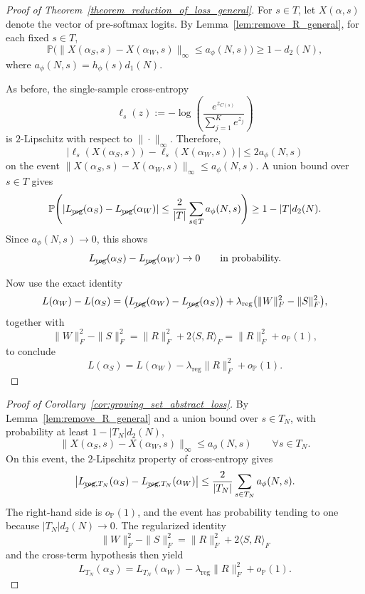 \documentclass[11pt]{article}
\theoremstyle{plain}
\theoremstyle{definition}
\theoremstyle{remark}
\newcommand{\PP}{\mathbb{P}}
\newcommand{\1}{\mathbf{1}}
\begin{document}
\begin{proof}[Proof of Theorem~\ref{theorem_reduction_of_loss_general}]
For \(s\in T\), let \(X(\alpha,s)\) denote the vector of pre-softmax logits. By Lemma~\ref{lem:remove_R_general}, for each fixed \(s\in T\),
\[
\PP\Big(
\|X(\alpha_S,s)-X(\alpha_W,s)\|_\infty\le a_\phi(N,s)
\Big)\ge 1-d_2(N),
\]
where \(a_\phi(N,s)=h_\phi(s)d_1(N)\).

As before, the single-sample cross-entropy
\[
\ell_s(z):=-\log\!\left(\frac{e^{z_{C(s)}}}{\sum_{j=1}^Ke^{z_j}}\right)
\]
is \(2\)-Lipschitz with respect to \(\|\cdot\|_\infty\). Therefore,
\[
|\ell_s(X(\alpha_S,s))-\ell_s(X(\alpha_W,s))|
\le
2a_\phi(N,s)
\]
on the event \(\|X(\alpha_S,s)-X(\alpha_W,s)\|_\infty\le a_\phi(N,s)\). A union bound over \(s\in T\) gives
\[
\PP\!\left(
|L_{\cancel{\mathrm{reg}}}(\alpha_S)-L_{\cancel{\mathrm{reg}}}(\alpha_W)|
\le
\frac{2}{|T|}\sum_{s\in T}a_\phi(N,s)
\right)
\ge
1-|T|d_2(N).
\]
Since \(a_\phi(N,s)\to0\), this shows
\[
L_{\cancel{\mathrm{reg}}}(\alpha_S)-L_{\cancel{\mathrm{reg}}}(\alpha_W)\to0
\qquad\text{in probability.}
\]

Now use the exact identity
\[
L(\alpha_W)-L(\alpha_S)
=
\big(L_{\cancel{\mathrm{reg}}}(\alpha_W)-L_{\cancel{\mathrm{reg}}}(\alpha_S)\big)
+
\lambda_{\mathrm{reg}}\big(\|W\|_F^2-\|S\|_F^2\big),
\]
together with
\[
\|W\|_F^2-\|S\|_F^2
=
\|R\|_F^2+2\langle S,R\rangle_F
=
\|R\|_F^2+o_{\PP}(1),
\]
to conclude
\[
L(\alpha_S)=L(\alpha_W)-\lambda_{\mathrm{reg}}\|R\|_F^2+o_{\PP}(1).
\]
\end{proof}

\begin{proof}[Proof of Corollary~\ref{cor:growing_set_abstract_loss}]
By Lemma~\ref{lem:remove_R_general} and a union bound over \(s\in T_N\), with probability at least \(1-|T_N|d_2(N)\),
\[
\|X(\alpha_S,s)-X(\alpha_W,s)\|_\infty\le a_\phi(N,s)
\qquad\forall s\in T_N.
\]
On this event, the \(2\)-Lipschitz property of cross-entropy gives
\[
\left|
L_{\cancel{\mathrm{reg}},T_N}(\alpha_S)
-
L_{\cancel{\mathrm{reg}},T_N}(\alpha_W)
\right|
\le
\frac{2}{|T_N|}\sum_{s\in T_N}a_\phi(N,s).
\]
The right-hand side is \(o_{\PP}(1)\), and the event has probability tending to one because \(|T_N|d_2(N)\to0\). The regularized identity
\[
\|W\|_F^2-\|S\|_F^2
=
\|R\|_F^2+2\langle S,R\rangle_F
\]
and the cross-term hypothesis then yield
\[
L_{T_N}(\alpha_S)
=
L_{T_N}(\alpha_W)
-\lambda_{\mathrm{reg}}\|R\|_F^2
+o_{\PP}(1).
\]
\end{proof}
\end{document}
